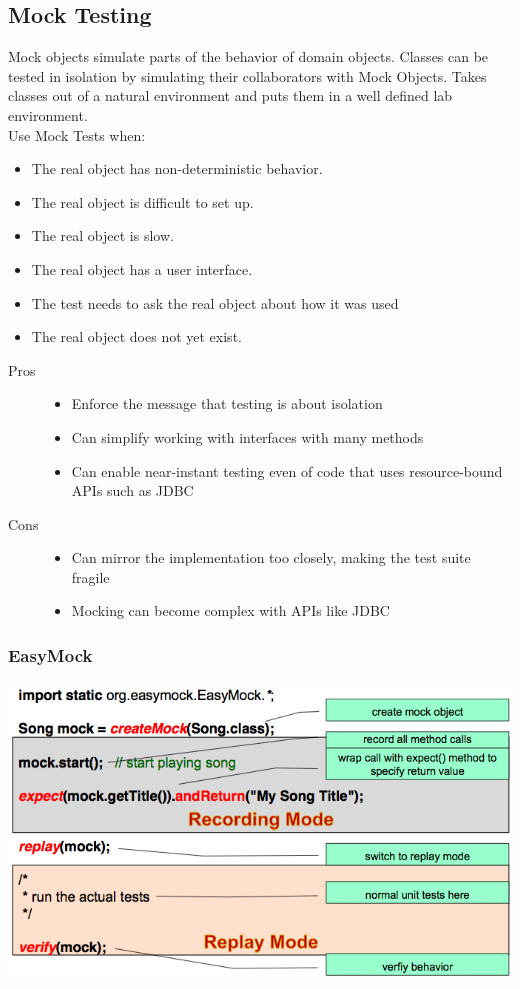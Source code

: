 \documentclass[a4paper,10pt]{article}
\begin{document}
\subsection{Mock Testing}
Mock objects simulate parts of the behavior of domain objects. Classes can be tested in isolation by simulating their collaborators with Mock Objects. Takes classes out of a natural environment and puts them in a well defined lab environment. \\
Use Mock Tests when:
\begin{itemize}
	\item The real object has non-deterministic behavior.
	\item The real object is difficult to set up.
	\item The real object is slow.
	\item The real object has a user interface.
	\item The test needs to ask the real object about how it was used
	\item The real object does not yet exist.
\end{itemize}
\begin{description}
	\item[Pros] \hfill
		\begin{itemize}
			\item Enforce the message that testing is about isolation
			\item Can simplify working with interfaces with many methods
			\item Can enable near-instant testing even of code that uses resource-bound APIs such as JDBC
		\end{itemize}
	\item[Cons] \hfill
		\begin{itemize}
			\item Can mirror the implementation too closely, making the test suite fragile	
			\item Mocking can become complex with APIs like JDBC
		\end{itemize}
\end{description}

\subsubsection{EasyMock}
\includegraphics[scale=0.6]{easymock.png}
\end{document}
